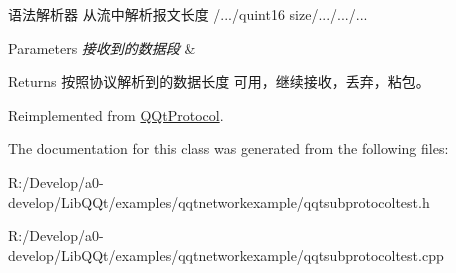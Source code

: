 语法解析器 从流中解析报文长度 /.../quint16 size/.../.../... 


\begin{DoxyParams}{Parameters}
{\em 接收到的数据段} & \\
\hline
\end{DoxyParams}
\begin{DoxyReturn}{Returns}
按照协议解析到的数据长度 可用，继续接收，丢弃，粘包。 
\end{DoxyReturn}


Reimplemented from \mbox{\hyperlink{class_q_qt_protocol_a00fd0c1ac23379ed3b9b25da9a34f39b}{Q\+Qt\+Protocol}}.



The documentation for this class was generated from the following files\+:\begin{DoxyCompactItemize}
\item 
R\+:/\+Develop/a0-\/develop/\+Lib\+Q\+Qt/examples/qqtnetworkexample/qqtsubprotocoltest.\+h\item 
R\+:/\+Develop/a0-\/develop/\+Lib\+Q\+Qt/examples/qqtnetworkexample/qqtsubprotocoltest.\+cpp\end{DoxyCompactItemize}
